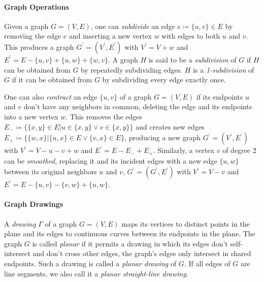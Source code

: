 \paragraph{Graph Operations}


Given a graph $G = (V, E)$, one can \emph{subdivide} an edge $e \coloneqq \{u,v\} \in E$ by removing the edge $e$ and inserting a new vertex $w$ with edges to both $u$ and $v$.
This produces a graph $G^\prime = (V^\prime, E^\prime)$ with $V^\prime = V + w$ and $E^\prime = E - \{u,v\} + \{u,w\} + \{w,v\}$.
A graph $H$ is said to be a \emph{subdivision} of $G$ if $H$ can be obtained from $G$ by repeatedly subdividing edges.
$H$ is a \emph{1-subdivision} of $G$ if it can be obtained from $G$ by subdividing every edge exactly once.

One can also \emph{contract} an edge $\{u,v\}$ of a graph $G = (V, E)$ if its endpoints $u$ and $v$ don't have any neighbors in common, deleting the edge and  its endpoints into a new vertex $w$.
This removes the edges $E_- \coloneqq \{ \{x,y\} \in E \vert u \in \{x,y\} \lor v \in \{x,y\} \}$ and creates new edges $E_+ \coloneqq \{ \{w,x\} \vert \{u,x\} \in E \lor \{v,x\} \in E \}$, producing a new graph $G^\prime = (V^\prime, E^\prime)$ with $V^\prime = V - u - v + w$ and $E^\prime = E - E_- + E_+$.
Similarly, a vertex $v$ of degree 2 can be \emph{smoothed}, replacing it and its incident edges with a new edge $\{u,w\}$ between its original neighbors $u$ and $v$, \ie{} $G^\prime = (G^\prime, E^\prime)$ with $V^\prime = V - v$ and $E^\prime = E - \{u,v\} - \{v,w\} + \{u,w\}$.



\paragraph{Graph Drawings}


A \emph{drawing} $\Gamma$ of a graph $G = (V, E)$ maps its vertices to distinct points in the plane and its edges to continuous curves between its endpoints in the plane.
The graph $G$ is called \emph{planar} if it permits a drawing in which its edges don't self-intersect and don't cross other edges, \ie{} the graph's edges only intersect in shared endpoints.
Such a drawing is called a \emph{planar drawing} of $G$.
If all edges of $G$ are line segments, we also call it a \emph{planar straight-line drawing}.

